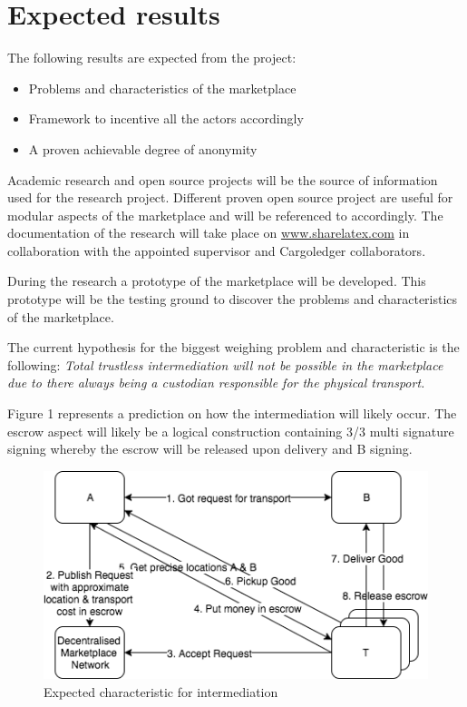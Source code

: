 \documentclass[11pt]{article}
\begin{document}
\section{Expected results}

The following results are expected from the project:
\begin{itemize}
  \item Problems and characteristics of the marketplace
  \item Framework to incentive all the actors accordingly
  \item A proven achievable degree of anonymity
\end{itemize}

Academic research and open source projects will be the source of information used for the research project. Different proven open source project are useful for modular aspects of the marketplace and will be referenced to accordingly. The documentation of the research will take place on \url{www.sharelatex.com} in collaboration with the appointed supervisor and Cargoledger collaborators. \par

During the research a prototype of the marketplace will be developed. This prototype will be the testing ground to discover the problems and characteristics of the marketplace. 

The current hypothesis for the biggest weighing problem and characteristic is the following:
\bigbreak
\textit{Total trustless intermediation will not be possible in the marketplace due to there always being a custodian responsible for the physical transport.}
\bigbreak

\noindent Figure 1 represents a prediction on how the intermediation will likely occur. The escrow aspect will likely be a logical construction containing 3/3 multi signature \cite{goldfeder2014securing} signing whereby the escrow will be released upon delivery and B signing.

\begin{figure}
    \centering
    \includegraphics[scale=0.8]{hypothesis_actor_balance.png}
    \caption{Expected characteristic for intermediation}
\end{figure}
\end{document}
